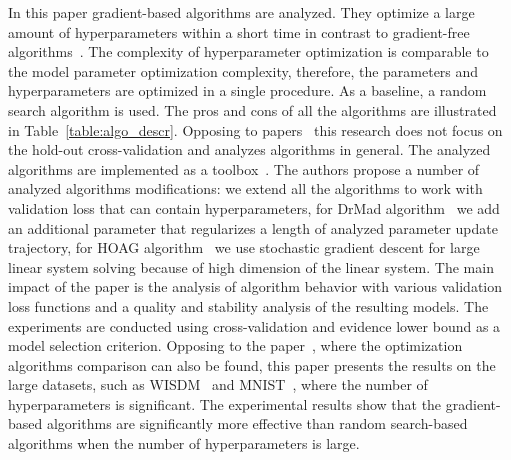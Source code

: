 \documentclass[smallcondensed]{svjour3}
\begin{document}
In this paper gradient-based algorithms are analyzed. They optimize a large amount of hyperparameters within a short time in contrast to gradient-free algorithms~\cite{hyper}.  The complexity of hyperparameter optimization is comparable to the model parameter optimization complexity, therefore, the parameters and hyperparameters are  optimized in a single procedure. As a baseline, a random search algorithm is used. The pros and cons of all the algorithms  
are illustrated in Table~\ref{table:algo_descr}. Opposing to papers~\cite{hyper_mad,hyper_hoag,hyper_greed} this research does not focus on the hold-out cross-validation and analyzes algorithms in general. The analyzed algorithms are implemented as a toolbox~\cite{pyfos}. The authors propose a number of analyzed algorithms modifications: we extend all the algorithms to work with validation loss that can contain hyperparameters, for DrMad algorithm~\cite{hyper_mad} we add an additional parameter that regularizes a length of analyzed parameter update trajectory, for HOAG algorithm~\cite{hyper_hoag} we use stochastic gradient descent for large linear system solving because of high dimension of the linear system.   The main impact of the paper is the analysis of algorithm behavior with various validation loss functions and a quality and stability analysis of the resulting models. The experiments are conducted using cross-validation and evidence lower bound as a model selection criterion. Opposing to the paper~\cite{hyper_hoag}, where  the optimization algorithms comparison can also be found, this paper presents the results on the large datasets, such as  WISDM~\cite{wisdm} and MNIST~\cite{mnist}, where the number of hyperparameters is significant. 
The experimental results show that the gradient-based algorithms are significantly more effective than random search-based algorithms when the number of hyperparameters is large. 
\end{document}
